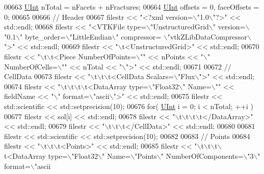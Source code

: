 \begin{DoxyCode}
00663     \hyperlink{namespaceFVCode3D_a4bf7e328c75d0fd504050d040ebe9eda}{UInt} nTotal = nFacets + nFractures;
00664     \hyperlink{namespaceFVCode3D_a4bf7e328c75d0fd504050d040ebe9eda}{UInt} offsets = 0, faceOffsets = 0;
00665 
00666     \textcolor{comment}{// Header}
00667     filestr << \textcolor{stringliteral}{"<?xml version=\(\backslash\)"1.0\(\backslash\)"?>"} << std::endl;
00668     filestr << \textcolor{stringliteral}{"<VTKFile type=\(\backslash\)"UnstructuredGrid\(\backslash\)" version=\(\backslash\)"0.1\(\backslash\)" byte\_order=\(\backslash\)"LittleEndian\(\backslash\)" compressor=
      \(\backslash\)"vtkZLibDataCompressor\(\backslash\)">"} << std::endl;
00669     filestr << \textcolor{stringliteral}{"\(\backslash\)t<UnstructuredGrid>"} << std::endl;
00670     filestr << \textcolor{stringliteral}{"\(\backslash\)t\(\backslash\)t<Piece NumberOfPoints=\(\backslash\)""} << nPoints << \textcolor{stringliteral}{"\(\backslash\)" NumberOfCells=\(\backslash\)""} << nTotal << \textcolor{stringliteral}{"\(\backslash\)">"} << 
      std::endl;
00671 
00672     \textcolor{comment}{// CellData}
00673     filestr << \textcolor{stringliteral}{"\(\backslash\)t\(\backslash\)t\(\backslash\)t<CellData Scalars=\(\backslash\)"Flux\(\backslash\)">"} << std::endl;
00674     filestr << \textcolor{stringliteral}{"\(\backslash\)t\(\backslash\)t\(\backslash\)t\(\backslash\)t<DataArray type=\(\backslash\)"Float32\(\backslash\)" Name=\(\backslash\)""} << fieldName << \textcolor{stringliteral}{"\(\backslash\)" format=\(\backslash\)"ascii\(\backslash\)">"} << 
      std::endl;
00675     filestr << std::scientific << std::setprecision(10);
00676     \textcolor{keywordflow}{for}( \hyperlink{namespaceFVCode3D_a4bf7e328c75d0fd504050d040ebe9eda}{UInt} i = 0; i < nTotal; ++i )
00677         filestr << sol[i] << std::endl;
00678     filestr << \textcolor{stringliteral}{"\(\backslash\)t\(\backslash\)t\(\backslash\)t\(\backslash\)t</DataArray>"} << std::endl;
00679     filestr << \textcolor{stringliteral}{"\(\backslash\)t\(\backslash\)t\(\backslash\)t</CellData>"} << std::endl;
00680 
00681     filestr << std::scientific << std::setprecision(10);
00682 
00683     \textcolor{comment}{// Points}
00684     filestr << \textcolor{stringliteral}{"\(\backslash\)t\(\backslash\)t\(\backslash\)t<Points>"} << std::endl;
00685     filestr << \textcolor{stringliteral}{"\(\backslash\)t\(\backslash\)t\(\backslash\)t\(\backslash\)t<DataArray type=\(\backslash\)"Float32\(\backslash\)" Name=\(\backslash\)"Points\(\backslash\)" NumberOfComponents=\(\backslash\)"3\(\backslash\)" format=\(\backslash\)"ascii
}
\end{DoxyCode}
